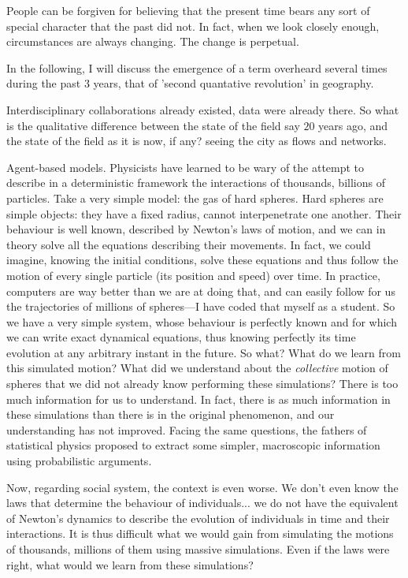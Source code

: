 People can be forgiven for believing that the present time bears any sort of
special character that the past did not. In fact, when we look closely enough,
circumstances are always changing. The change is perpetual. 

In the following, I will discuss the emergence of a term overheard several times
during the past $3$ years, that of 'second quantative revolution' in geography.


Interdisciplinary collaborations already existed, data were already there. So
what is the qualitative difference between the state of the field say $20$ years
ago, and the state of the field as it is now, if any?\cite{Batty:2008,Batty:2012,Batty:2013} seeing the city as flows and networks.


Agent-based models. Physicists have learned to be wary of the attempt to
describe in a deterministic framework the interactions of thousands, billions of
particles. Take a very simple model: the gas of hard spheres. Hard spheres are
simple objects: they have a fixed radius, cannot interpenetrate one another.
Their behaviour is well known, described by Newton's laws of motion, and we can
in theory solve all the equations describing their movements. In fact, we could
imagine, knowing the initial conditions, solve these equations and thus follow
the motion of every single particle (its position and speed) over time. In
practice, computers are way better than we are at doing that, and can easily follow for
us the trajectories of millions of spheres---I have coded that myself as a
student. So we have a very simple system, whose behaviour is perfectly known and
for which we can write exact dynamical equations, thus knowing perfectly its
time evolution at any arbitrary instant in the future. So what? What do we learn
from this simulated motion? What did we understand about the \emph{collective}
motion of spheres that we did not already know performing these simulations?
There is too much information for us to understand. In fact, there is as much
information in these simulations than there is in the original phenomenon, and
our understanding has not improved.
Facing the same questions, the fathers of statistical physics proposed to
extract some simpler, macroscopic information using probabilistic arguments.

Now, regarding social system, the context is even worse. We don't even know the
laws that determine the behaviour of individuals... we do not have the
equivalent of Newton's dynamics to describe the evolution of individuals in time
and their interactions. It is thus difficult what we would gain from simulating
the motions of thousands, millions of them using massive simulations. Even if
the laws were right, what would we learn from these simulations?


